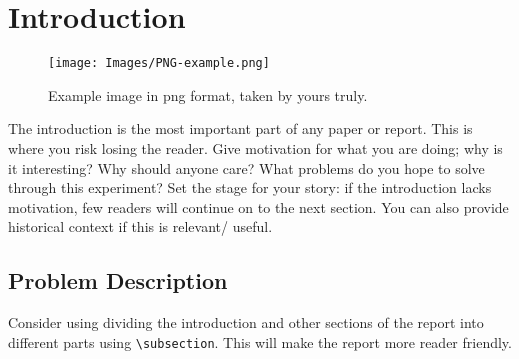 \section{Introduction}


\begin{figure}
    \centering
    \texttt{[image: Images/PNG-example.png]}
    \caption{Example image in png format, taken by yours truly.}
    \label{fig:NTNU-letters}
\end{figure}

The introduction is the most important part of any paper or report. This is where you risk
losing the reader. Give motivation for what you are doing; why is it interesting? Why
should anyone care? What problems do you hope to solve through this experiment? Set
the stage for your story: if the introduction lacks motivation, few readers will continue
on to the next section. You can also provide historical context if this is relevant/ useful.

\subsection{Problem Description}
Consider using dividing the introduction and other sections of the report into different parts using \verb+\subsection+. This will make the report more reader friendly. 


